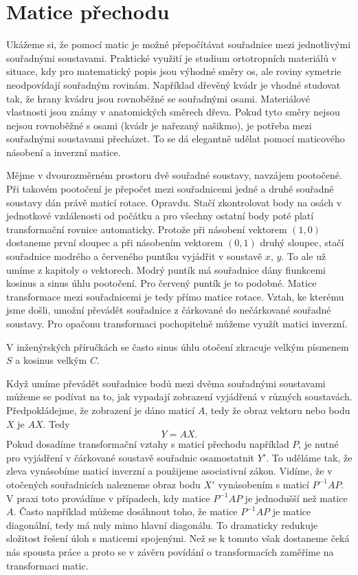 \documentclass[12pt]{article}
\begin{document}
\section*{Matice přechodu}

Ukážeme si, že pomocí matic je možné přepočítávat souřadnice mezi jednotlivými souřadnými soustavami. Praktické využití je studium ortotropních materiálů v situace, kdy pro matematický popis jsou výhodné směry os, ale roviny symetrie neodpovídají souřadným rovinám. Například dřevěný kvádr je vhodné studovat tak, že hrany kvádru jsou rovnoběžné se souřadnými osami. Materiálové vlastnosti jsou známy v anatomických směrech dřeva. Pokud tyto směry nejsou nejsou rovnoběžné s osami (kvádr je nařezaný našikmo), je potřeba mezi souřadnými soustavami přecházet. To se dá elegantně udělat pomocí maticového násobení a inverzní matice. 

Mějme v dvourozměrném prostoru dvě souřadné soustavy, navzájem pootočené. Při takovém pootočení je přepočet mezi souřadnicemi jedné a druhé souřadné soustavy dán právě maticí rotace. Opravdu. Stačí zkontrolovat body na osách v jednotkové vzdálenosti od počátku a pro všechny ostatní body poté platí transformační rovnice automaticky. Protože při násobení vektorem $(1,0)$ dostaneme první sloupec a při násobením vektorem $(0,1)$ druhý sloupec, stačí souřadnice modrého a červeného puntíku vyjádřit v soustavě $x$, $y$. To ale už umíme z kapitoly o vektorech. Modrý puntík má souřadnice dány fiunkcemi kosinus a sinus úhlu pootočení. Pro červený puntík je to podobné. Matice transformace mezi souřadnicemi je tedy přímo matice rotace. Vztah, ke kterému jsme došli, umožní převádět souřadnice z čárkované do nečárkované souřadné soustavy. Pro opačonu transformaci pochopitelně můžeme využít matici inverzní.

V inženýrských příručkách se často sinus úhlu otočení zkracuje velkým písmenem $S$ a kosinus velkým $C$.

Když umíme převádět souřadnice bodů mezi dvěma souřadnými soustavami můžeme se podívat na to, jak vypadají zobrazení vyjádřená v různých soustavách. Předpokládejme, že zobrazení je dáno maticí $A$, tedy že obraz vektoru nebo bodu  $X$ je $AX$. Tedy $$Y=AX.$$ Pokud dosadíme transformační vztahy s maticí přechodu například $P$, je nutné pro vyjádření v čárkované soustavě souřadnic osamostatnit $Y'$. To uděláme tak, že zleva vynásobíme maticí inverzní a použijeme asociativní zákon. Vidíme, že v otočených souřadnicích nalezneme obraz bodu $X'$ vynásobením s maticí $P^{-1}AP$. V praxi toto provádíme v případech, kdy matice $P^{-1}AP$ je jednodušší než matice $A$. Často například můžeme dosáhnout toho, že matice $P^{-1}AP$ je matice diagonální, tedy má nuly mimo hlavní diagonálu. To dramaticky redukuje složitost řešení úloh s maticemi spojenými. Než se k tomuto však dostaneme čeká nás spousta práce a proto se v závěru povídání o transformacích zaměříme na transformaci matic.
\end{document}
